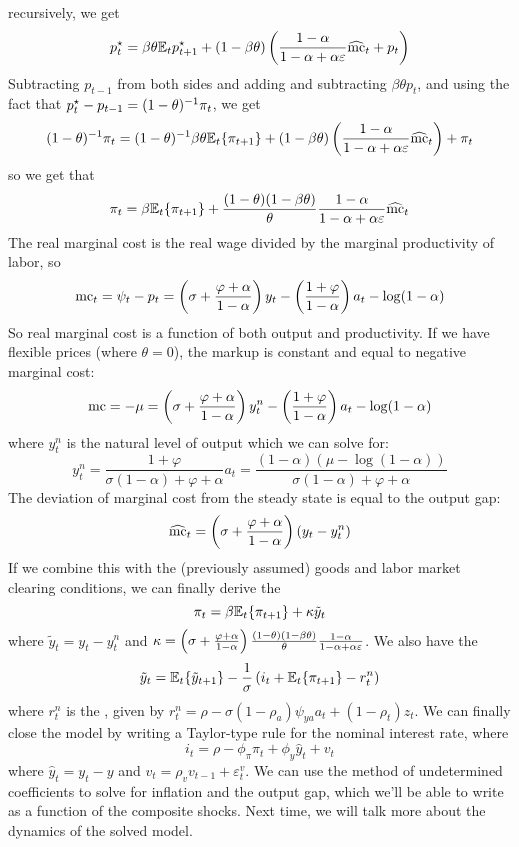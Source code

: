 \documentclass[10pt]{article}
\begin{document}
recursively, we get \[p_t^\star =\beta\theta \mathbb{E}_t p_{t+1}^\star + (1-\beta\theta) \left(  \frac{1-\alpha}{1-\alpha +\alpha\varepsilon}\widehat{\text{mc}}_{t} + p_{t}\right)\]Subtracting $p_{t-1}$ from both sides and adding and subtracting $\beta\theta p_t$, and using the fact that $p_t^\star - p_{t-1} = (1-\theta)^{-1} \pi_t$, we get \[(1-\theta)^{-1} \pi_t = (1-\theta)^{-1} \beta\theta \mathbb{E}_t \{\pi_{t+1}\} + (1-\beta\theta) \left(  \frac{1-\alpha}{1-\alpha +\alpha\varepsilon}\widehat{\text{mc}}_{t}\right) + \pi_t\]so we get that\[\pi_t = \beta \mathbb{E}_t\{\pi_{t+1}\} + \frac{(1-\theta)(1-\beta\theta)}{\theta} \frac{1-\alpha}{1-\alpha + \alpha\varepsilon} \widehat{\text{mc}}_t\]The real marginal cost is the real wage divided by the marginal productivity of labor, so\[\text{mc}_t = \psi_t - p_t = \left( \sigma + \frac{\varphi + \alpha}{1-\alpha} \right) y_t - \left( \frac{1+\varphi}{1-\alpha}\right) a_t - \log(1-\alpha)\]So real marginal cost is a function of both output and productivity. If we have flexible prices (where $\theta=0$), the markup is constant and equal to negative marginal cost:\[\text{mc} = -\mu = \left( \sigma + \frac{\varphi + \alpha}{1-\alpha} \right) y_t^n - \left( \frac{1+\varphi}{1-\alpha}\right) a_t - \log(1-\alpha)\]where $y_t^n$ is the natural level of output which we can solve for: \[y_t^n = \frac{1+\varphi}{\sigma(1-\alpha) + \varphi + \alpha} a_t = \frac{(1-\alpha)(\mu - \log(1-\alpha))}{\sigma (1-\alpha) + \varphi + \alpha}\]The deviation of marginal cost from the steady state is equal to the output gap:\[\widehat{\text{mc}}_t = \left( \sigma + \frac{\varphi+\alpha}{1-\alpha}\right) (y_t - y_t^n)\]If we combine this with the (previously assumed) goods and labor market clearing conditions, we can finally derive the \[\pi_t = \beta \mathbb{E}_t\{\pi_{t+1}\} + \kappa \tilde{y}_t\]where $\tilde{y}_t = y_t - y_t^n$ and $\kappa = \left( \sigma + \frac{\varphi + \alpha}{1-\alpha}\right) \frac{(1-\theta)(1-\beta\theta)}{\theta} \frac{1-\alpha}{1-\alpha+\alpha\varepsilon}$. We also have the \[\tilde{y}_t = \mathbb{E}_t\{\tilde{y}_{t+1}\} - \frac{1}{\sigma} \left( i_t + \mathbb{E}_t\{\pi_{t+1}\}-r_t^n\right)\]where $r_t^n$ is the , given by $r_t^n = \rho - \sigma(1-\rho_a)\psi_{ya}a_t + (1-\rho_t) z_t$. We can finally close the model by writing a Taylor-type rule for the nominal interest rate, where \[i_t = \rho - \phi_\pi \pi_t + \phi_y \hat{y}_t + v_t\]where $\hat{y}_t = y_t - y$ and $v_t = \rho_v v_{t-1} + \varepsilon_t^v$. We can use the method of undetermined coefficients to solve for inflation and the output gap, which we'll be able to write as a function of the composite shocks. Next time, we will talk more about the dynamics of the solved model.
\end{document}

